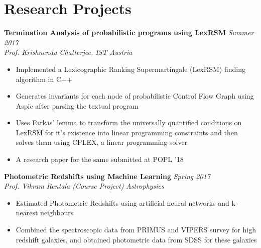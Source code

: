 \documentclass[a4paper,10pt]{article}
\begin{document}
\section{Research Projects}
\textbf{Termination Analysis of probabilistic programs using LexRSM} \hfill \textit{Summer 2017}\\
\textit{Prof. Krishnendu Chatterjee, IST Austria}
\begin{itemize}
    \item Implemented a Lexicographic Ranking Supermartingale (LexRSM) finding algorithm in C++
    \item Generates invariants for each node of probabilistic Control Flow Graph using Aspic after parsing the textual program
    \item Uses Farkas' lemma to transform the universally quantified conditions on LexRSM for it's existence into linear programming constraints and then solves them using CPLEX, a linear programming solver
    \item A research paper for the same submitted at POPL '18
\end{itemize}
\textbf{Photometric Redshifts using Machine Learning} \hfill \textit{Spring 2017}\\
\textit{Prof. Vikram Rentala (Course Project)} \hfill \textit{Astrophysics}
\begin{itemize}
    \item Estimated Photometric Redshifts using artificial neural networks and k-nearest neighbours
\vspace{-2pt}
    \item Combined the spectroscopic data from PRIMUS and VIPERS survey for high redshift galaxies, and obtained photometric data from SDSS for these galaxies
\end{itemize}
\vspace{-6pt}
\end{document}
